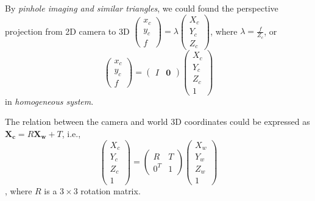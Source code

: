 \documentclass[12pt, a4paper]{article}
\begin{document}
By \emph{pinhole imaging \emph{and} similar triangles}, we could found the perspective projection from 2D camera to 3D $\begin{pmatrix}x_c\\y_c\\f\end{pmatrix}=\lambda\begin{pmatrix}X_c\\Y_c\\Z_c\end{pmatrix}$, where $\lambda=\frac{f}{Z_c}$, or $$\begin{pmatrix}x_c\\y_c\\f\end{pmatrix}=\begin{pmatrix}I&\mathbf{0}\end{pmatrix}\begin{pmatrix}X_c\\Y_c\\Z_c\\1\end{pmatrix}$$ in \emph{homogeneous system}.

The relation between the camera and world 3D coordinates could be expressed as $\mathbf{X_c}=R\mathbf{X_w}+T$, i.e., $$\begin{pmatrix}X_c\\Y_c\\Z_c\\1\end{pmatrix}=\begin{pmatrix}R&T\\0^T&1\end{pmatrix}\begin{pmatrix}X_w\\Y_w\\Z_w\\1\end{pmatrix}$$, where $R$ is a $3\times3$ rotation matrix.
\end{document}
